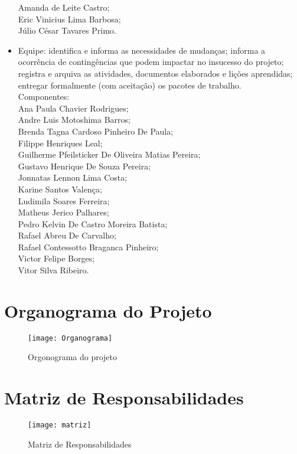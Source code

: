 \documentclass[12pt,openright,oneside,a4paper,brazil]{abntex2}
\begin{document}
\begin{itemize}
  Amanda de Leite Castro;\\
  Eric Vinicius Lima Barbosa;\\
  Júlio César Tavares Primo.\\
  \item Equipe: identifica e informa as necessidades de mudanças; informa a ocorrência de contingências que podem impactar no insucesso do projeto; registra e arquiva as atividades, documentos elaborados e lições aprendidas; entregar formalmente (com aceitação) os pacotes de trabalho.\\
Componentes:\\
Ana Paula Chavier Rodrigues;\\
Andre Luis Motoshima Barros;\\
Brenda Tagna Cardoso Pinheiro De Paula;\\
Filippe Henriques Leal;\\
Guilherme Pfeilsticker De Oliveira Matias Pereira;\\
Gustavo Henrique De Souza Pereira;\\
Jonnatas Lennon Lima Costa;\\
Karine Santos Valença;\\
Ludimila Soares Ferreira;\\
Matheus Jerico Palhares;\\
Pedro Kelvin De Castro Moreira Batista;\\
Rafael Abreu De Carvalho;\\
Rafael Contessotto Braganca Pinheiro;\\
Victor Felipe Borges;\\
Vitor Silva Ribeiro.\\
  \end{itemize}
\newpage
\section{Organograma do Projeto}
  \begin{figure}[!ht]
\centering
\texttt{[image: Organograma]}
\caption{Orgonograma do projeto}
\label{Rotulo}
\end{figure}
\FloatBarrier

 \section{Matriz de Responsabilidades}
 \FloatBarrier
 \begin{figure}[h]
\texttt{[image: matriz]}
\label{matrizderesponsabilidades}
\caption{Matriz de Responsabilidades}
 \end{figure}
\end{document}
